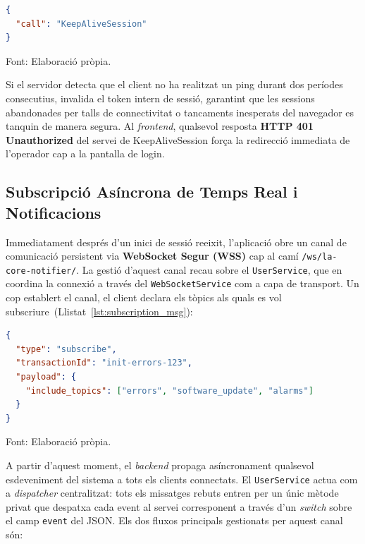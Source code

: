 \begin{lstlisting}[basicstyle=\footnotesize, language=json, label={lst:keepalive_msg}, caption={Trama de Keep-Alive enviada periòdicament al servidor.}]
{
  "call": "KeepAliveSession"
}
\end{lstlisting}
\smallskip\par{\small\noindent Font: Elaboració pròpia.}
\medskip

Si el servidor detecta que el client no ha realitzat un ping durant dos períodes consecutius, invalida el token intern de sessió, garantint que les sessions abandonades per talls de connectivitat o tancaments inesperats del navegador es tanquin de manera segura. Al \textit{frontend}, qualsevol resposta \textbf{HTTP 401 Unauthorized} del servei de KeepAliveSession força la redirecció immediata de l'operador cap a la pantalla de login.

\subsection{Subscripció Asíncrona de Temps Real i Notificacions}
Immediatament després d'un inici de sessió reeixit, l'aplicació obre un canal de comunicació persistent via \textbf{WebSocket Segur (WSS)} cap al camí \texttt{/ws/la-core\allowbreak{}-notifier/}. La gestió d'aquest canal recau sobre el \texttt{UserService}, que en coordina la connexió a través del \texttt{WebSocketService} com a capa de transport. Un cop establert el canal, el client declara els tòpics als quals es vol subscriure~(Llistat~\ref{lst:subscription_msg}):

\begin{lstlisting}[basicstyle=\footnotesize, language=json, label={lst:subscription_msg}, caption={Missatge de subscripció enviat pel client en inicialitzar el canal \texttt{la-core-notifier}.}]
{
  "type": "subscribe",
  "transactionId": "init-errors-123",
  "payload": {
    "include_topics": ["errors", "software_update", "alarms"]
  }
}
\end{lstlisting}
\smallskip\par{\small\noindent Font: Elaboració pròpia.}

\medskip
A partir d'aquest moment, el \textit{backend} propaga asíncronament qualsevol esdeveniment del sistema a tots els clients connectats. El \texttt{UserService} actua com a \textit{dispatcher} centralitzat: tots els missatges rebuts entren per un únic mètode privat que despatxa cada event al servei corresponent a través d'un \textit{switch} sobre el camp \texttt{event} del JSON. Els dos fluxos principals gestionats per aquest canal són:

